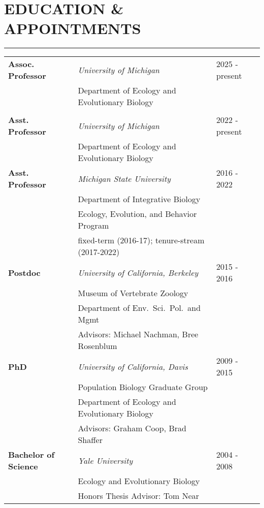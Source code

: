 \documentclass{gbcv}
\begin{document}
\section*{EDUCATION \& APPOINTMENTS}
\vspace{-0.6cm}
\rule{470pt}{0.4pt}
%
\begin{tabular}{p{} p{} p{}} 
\rule{0pt}{4ex}\bf{Assoc. Professor} & \it{University of Michigan} & \hfill 2025 - present\\
 & \hspace{0.5cm}Department of Ecology and Evolutionary Biology & \\
\\
\bf{Asst. Professor} & \it{University of Michigan} & \hfill 2022 - present\\
 & \hspace{0.5cm}Department of Ecology and Evolutionary Biology & \\
%
\rule{0pt}{4ex}
%
\bf{Asst. Professor} & \it{Michigan State University} & \hfill 2016 - 2022\\
 & \hspace{0.5cm}Department of Integrative Biology & \\
 & \hspace{0.5cm}Ecology, Evolution, and Behavior Program& \\
  & \hspace{0.5cm}fixed-term (2016-17); tenure-stream (2017-2022)& \\
%
\rule{0pt}{4ex}
%
\bf{Postdoc} & \it{University of California, Berkeley} & \hfill 2015 - 2016\\
 & \hspace{0.5cm}Museum of Vertebrate Zoology & \\
 & \hspace{0.5cm}Department of Env.\ Sci.\ Pol.\ and Mgmt& \\
 & \hspace{0.5cm}Advisors: Michael Nachman, Bree Rosenblum & \\ 
%
\rule{0pt}{4ex}
%
\bf{PhD} & \it{University of California, Davis}  & \hfill 2009 - 2015\\
 & \hspace{0.5cm}Population Biology Graduate Group & \\
 & \hspace{0.5cm}Department of Ecology and Evolutionary Biology & \\
 & \hspace{0.5cm}Advisors: Graham Coop, Brad Shaffer & \\ 
%
\rule{0pt}{4ex}
%
\textbf{Bachelor of Science} & \it{Yale University} & \hfill 2004 - 2008 \\
& \hspace{0.5cm}Ecology and Evolutionary Biology & \\
& \hspace{0.5cm}Honors Thesis Advisor: Tom Near & \\
\end{tabular}
%
\vspace{0.1cm}
\end{document}
